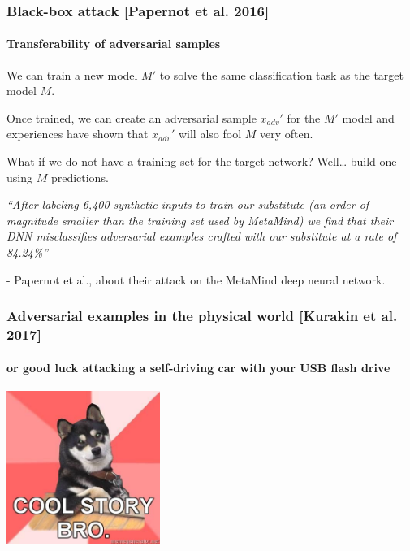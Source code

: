 \documentclass[9pt]{beamer}
\begin{document}
\begin{frame}
  \frametitle{Black-box attack [Papernot et al. 2016]}

  \framesubtitle{Transferability of adversarial samples}


  We can train a new model $M'$ to solve the same classification task
  as the target model $M$.

  \pause

  \bigskip

  Once trained, we can create an adversarial sample $x_{adv}'$ for the
  $M'$ model and experiences have shown that $x_{adv}'$ will also fool
  $M$ very often.

  \pause

  \bigskip

  What if we do not have a training set for the target network?
  Well\dots{} build one using $M$ predictions.

  \pause

  \bigskip

  \textit{``After labeling 6,400 synthetic inputs to train our
    substitute (an order of magnitude smaller than the training set
    used by MetaMind) we find that their DNN misclassifies adversarial
    examples crafted with our substitute at a rate of 84.24\%''}

  \smallskip

  - Papernot et al., about their attack on the MetaMind deep neural
  network.

\end{frame}

\begin{frame}
  \frametitle{Adversarial examples in the physical world [Kurakin et
      al. 2017]}

  \framesubtitle{or good luck attacking a self-driving car with
    your USB flash drive}

  \begin{center}
    \includegraphics[width = 5cm]{images/cool_story_bro_2.jpg}
  \end{center}

\end{frame}
\end{document}
